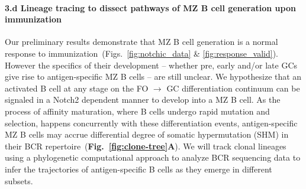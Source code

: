 \documentclass[11pt]{article}
\newcommand{\para}[1]{\vspace*{-4.5mm}\paragraph{#1}}
\newcommand{\red}[1]{{\color{red}{#1}}}
\begin{document}
%
%



\para{3.d Lineage tracing to dissect pathways of MZ B cell generation upon immunization}
Our preliminary results demonstrate that MZ B cell generation is a normal response to immunization~(Figs.~\ref{fig:notchic_data} \& \ref{fig:response_valid}).
However the specifics of their development -- whether pre, early and/or late GCs give rise to antigen-specific MZ B cells -- are still unclear.
We hypothesize that an activated B cell at any stage on the FO $\rightarrow$ GC differentiation continuum can be signaled in a Notch2 dependent manner to develop into a MZ B cell.
As the process of affinity maturation, where B cells undergo rapid mutation and selection, happens concurrently with these differentiation events, antigen-specific MZ B cells  may accrue differential degree of somatic hypermutation (SHM) in their BCR repertoire~(\textbf{Fig.~\ref{fig:clone-tree}A}).
We will track clonal lineages %
using a phylogenetic computational approach to analyze BCR sequencing data to infer the trajectories of antigen-specific B cells as they emerge in different subsets. %
\end{document}
